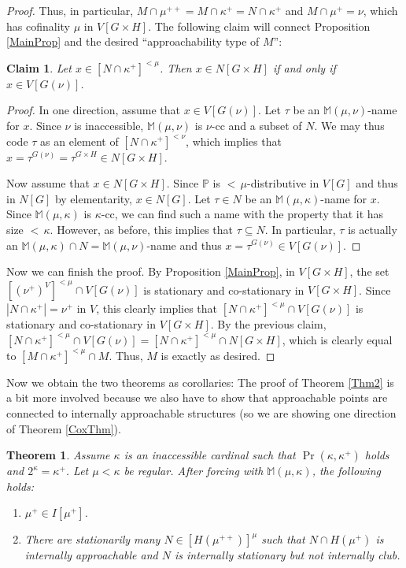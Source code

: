 \documentclass[a4paper]{amsart}
\theoremstyle{definition}
\theoremstyle{remark}
\theoremstyle{plain}
\newtheorem{mysen}[mydef]{Theorem}
\newtheorem*{myclaim}{Claim}
\numberwithin{mydef}{section}
\newcommand{\dM}{\mathbb{M}}
\newcommand{\dP}{\mathbb{P}}
\begin{document}
\begin{proof}
		Thus, in particular, $M\cap\mu^{++}=M\cap\kappa^+=N\cap\kappa^+$ and $M\cap\mu^+=\nu$, which has cofinality $\mu$ in $V[G\times H]$. The following claim will connect Proposition \ref{MainProp} and the desired ``approachability type of $M$'':
		
		\begin{myclaim}
			Let $x\in[N\cap\kappa^+]^{<\mu}$. Then $x\in N[G\times H]$ if and only if $x\in V[G(\nu)]$.
		\end{myclaim}
		
		\begin{proof}
			In one direction, assume that $x\in V[G(\nu)]$. Let $\tau$ be an $\dM(\mu,\nu)$-name for $x$. Since $\nu$ is inaccessible, $\dM(\mu,\nu)$ is $\nu$-cc and a subset of $N$. We may thus code $\tau$ as an element of $[N\cap\kappa^+]^{<\nu}$, which implies that $x=\tau^{G(\nu)}=\tau^{G\times H}\in N[G\times H]$.
			
			Now assume that $x\in N[G\times H]$. Since $\dP$ is ${<}\,\mu$-distributive in $V[G]$ and thus in $N[G]$ by elementarity, $x\in N[G]$. Let $\tau\in N$ be an $\dM(\mu,\kappa)$-name for $x$. Since $\dM(\mu,\kappa)$ is $\kappa$-cc, we can find such a name with the property that it has size ${<}\,\kappa$. However, as before, this implies that $\tau\subseteq N$. In particular, $\tau$ is actually an $\dM(\mu,\kappa)\cap N=\dM(\mu,\nu)$-name and thus $x=\tau^{G(\nu)}\in V[G(\nu)]$.
		\end{proof}
		
		Now we can finish the proof. By Proposition \ref{MainProp}, in $V[G\times H]$, the set $[(\nu^+)^V]^{<\mu}\cap V[G(\nu)]$ is stationary and co-stationary in $V[G\times H]$. Since $|N\cap\kappa^+|=\nu^+$ in $V$, this clearly implies that $[N\cap\kappa^+]^{<\mu}\cap V[G(\nu)]$ is stationary and co-stationary in $V[G\times H]$. By the previous claim, $[N\cap\kappa^+]^{<\mu}\cap V[G(\nu)]=[N\cap\kappa^+]^{<\mu}\cap N[G\times H]$, which is clearly equal to $[M\cap\kappa^+]^{<\mu}\cap M$. Thus, $M$ is exactly as desired.
	\end{proof}
	
	Now we obtain the two theorems as corollaries: The proof of Theorem \ref{Thm2} is a bit more involved because we also have to show that approachable points are connected to internally approachable structures (so we are showing one direction of Theorem \ref{CoxThm}).
	
	\begin{mysen}\label{Theorem2}
		Assume $\kappa$ is an inaccessible cardinal such that $\Pr(\kappa,\kappa^+)$ holds and $2^{\kappa}=\kappa^+$. Let $\mu<\kappa$ be regular. After forcing with $\dM(\mu,\kappa)$, the following holds:
		\begin{enumerate}
			\item $\mu^+\in I[\mu^+]$.
			\item There are stationarily many $N\in[H(\mu^{++})]^{\mu}$ such that $N\cap H(\mu^+)$ is internally approachable and $N$ is internally stationary but not internally club.
		\end{enumerate}
	\end{mysen}
	
\end{document}
